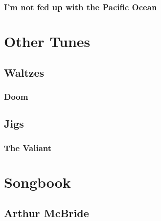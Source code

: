 \documentclass[letterpaper,10pt,english]{sphinxmanual}
\begin{document}
\subsection{I’m not fed up with the Pacific Ocean}
\label{\detokenize{Pipe Tunes/I'm not fed up with the Pacific Ocean:i-m-not-fed-up-with-the-pacific-ocean}}
\noindent{}


\chapter{Other Tunes}
\label{\detokenize{Other Tunes/index:other-tunes}}\label{\detokenize{Other Tunes/index::doc}}

\section{Waltzes}
\label{\detokenize{Other Tunes/Waltzes:waltzes}}\label{\detokenize{Other Tunes/Waltzes::doc}}

\subsection{Doom}
\label{\detokenize{Other Tunes/Waltzes:doom}}
\noindent{}


\section{Jigs}
\label{\detokenize{Other Tunes/Jigs:jigs}}\label{\detokenize{Other Tunes/Jigs::doc}}

\subsection{The Valiant}
\label{\detokenize{Other Tunes/Jigs:the-valiant}}
\noindent{}


\chapter{Songbook}
\label{\detokenize{Songs/index:songbook}}\label{\detokenize{Songs/index::doc}}

\section{Arthur McBride}
\label{\detokenize{Songs/Arthur McBride:arthur-mcbride}}\label{\detokenize{Songs/Arthur McBride::doc}}
\noindent{}
\end{document}
